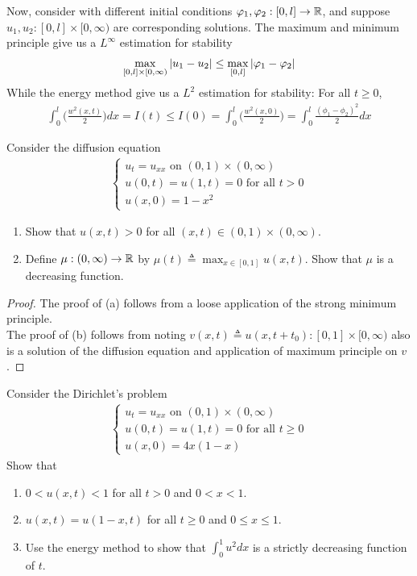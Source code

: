 \documentclass{report}
\begin{document}
\begin{mdframed}
Now, consider  with different initial conditions $\varphi_1,\varphi_2: [0,l]\rightarrow \mathbb{R}$, and suppose $u_1,u_2:[0,l]\times [0,\infty)$ are corresponding solutions. The maximum and minimum principle give us a $L^\infty$ estimation for stability 
\begin{align*}
\max_{[0,l]\times [0,\infty)} \left|u_1-u_2\right|\leq \max_{[0,l]}\left|\varphi_1-\varphi_2\right|
\end{align*}
While the energy method give us a $L^2$ estimation for  stability: For all $t\geq 0$,  
\begin{align*}
\int_0^l \Big(\frac{w^2(x,t)}{2} \Big)dx =I(t)\leq I(0)=\int_0^l \Big(\frac{w^2(x,0)}{2} \Big)= \int_0^l \frac{(\phi_1-\phi_2)^2}{2}dx
\end{align*}
\end{mdframed}
\begin{question}{}{}
Consider the diffusion equation  
\begin{align*}
\begin{cases}  
u_t=u_{xx}\text{ on }(0,1)\times (0,\infty)\\
u(0,t)=u(1,t)=0 \text{ for all }t>0\\
u(x,0)=1-x^2
\end{cases}
\end{align*}
\begin{enumerate}[label=(\alph*)]
  \item Show that $u(x,t)>0$ for all $(x,t)\in (0,1)\times (0,\infty)$. 
  \item Define $\mu : (0,\infty)\rightarrow \mathbb{R}$ by $\mu(t)\triangleq \max_{x\in [0,1]} u(x,t)$. Show that $\mu$ is a decreasing function. 
\end{enumerate}
\end{question}
\begin{proof}
The proof of (a) follows from a loose application of the strong minimum principle. \\

The proof of (b) follows from noting $v(x,t)\triangleq u(x,t+t_0):[0,1]\times [0,\infty)$ also is a solution of the diffusion equation and application of maximum principle on $v$.
\end{proof}
\begin{question}{}{}
Consider the Dirichlet's problem 
\begin{align*}
\begin{cases}  
u_t=u_{xx}\text{ on }(0,1)\times (0,\infty)\\
u(0,t)=u(1,t)=0 \text{ for all }t\geq 0\\
u(x,0)=4x(1-x)
\end{cases}
\end{align*}
Show that 
\begin{enumerate}[label=(\alph*)]
  \item $0<u(x,t)<1$ for all $t>0$ and  $0<x<1$.  
  \item $u(x,t)=u(1-x,t)$ for all $t\geq 0$ and $0\leq x\leq 1$. 
  \item Use the energy method to show that $\int_0^1 u^2dx$ is a strictly decreasing function of $t$.
\end{enumerate}
\end{question}
\end{document}
